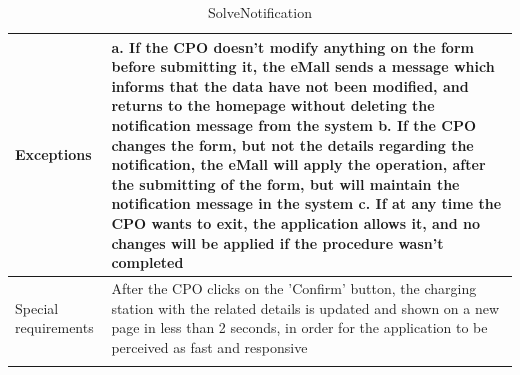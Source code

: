 \begin{center}
\begin{longtable}{p{4cm} p{11cm}}
     \hline
     Exceptions &   a. If the CPO doesn't modify anything on the form before submitting it, the eMall sends a                       message which informs that the data have not been modified, and returns to the homepage without                 deleting the notification message from the system \newline
                    b. If the CPO changes the form, but not the details regarding the notification, the eMall will apply the operation, after the submitting of the form, but will maintain the notification message in the system \newline 
                    c. If at any time the CPO wants to exit, the application allows it, and no changes will be applied if the procedure wasn't completed \\
     \hline
     Special requirements & After the CPO clicks on the 'Confirm' button, the charging station with the related details is updated and shown on a new page in less than 2 seconds, in order for the application to be perceived as fast and responsive \\
     \hline
    \caption{SolveNotification}
    \label{tab:SolveNotification}
    \end{longtable}
\end{center}


